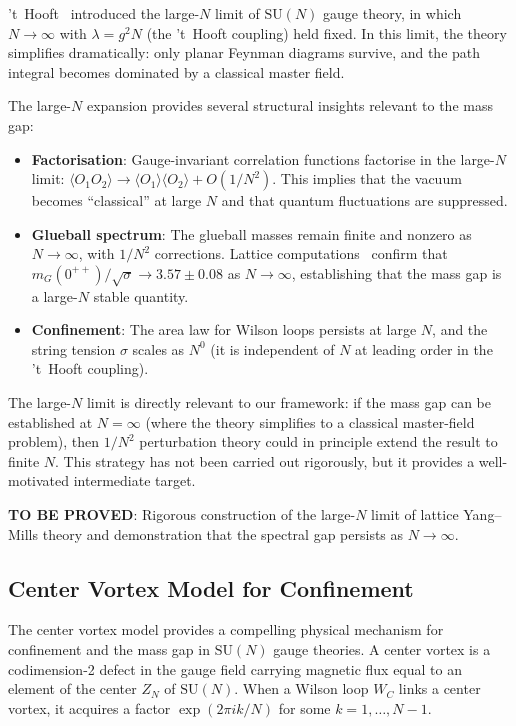 \documentclass[11pt]{article}
\begin{document}
't~Hooft~\cite{tHooft} introduced the large-$N$ limit of $\mathrm{SU}(N)$
gauge theory, in which $N \to \infty$ with $\lambda = g^2 N$ (the
't~Hooft coupling) held fixed.  In this limit, the theory simplifies
dramatically: only planar Feynman diagrams survive, and the path integral
becomes dominated by a classical master field.

The large-$N$ expansion provides several structural insights relevant to
the mass gap:
\begin{itemize}
  \item \textbf{Factorisation}: Gauge-invariant correlation functions
    factorise in the large-$N$ limit:
    $\langle O_1 O_2 \rangle \to \langle O_1 \rangle \langle O_2 \rangle
    + O(1/N^2)$.  This implies that the vacuum becomes ``classical'' at
    large $N$ and that quantum fluctuations are suppressed.
  \item \textbf{Glueball spectrum}: The glueball masses remain finite and
    nonzero as $N \to \infty$, with $1/N^2$ corrections.  Lattice
    computations~\cite{LTW} confirm that
    $m_G(0^{++})/\sqrt{\sigma} \to 3.57 \pm 0.08$ as $N \to \infty$,
    establishing that the mass gap is a large-$N$ stable quantity.
  \item \textbf{Confinement}: The area law for Wilson loops persists at
    large $N$, and the string tension $\sigma$ scales as $N^0$ (it is
    independent of $N$ at leading order in the 't~Hooft coupling).
\end{itemize}

\noindent
The large-$N$ limit is directly relevant to our framework: if the mass gap
can be established at $N = \infty$ (where the theory simplifies to a
classical master-field problem), then $1/N^2$ perturbation theory could in
principle extend the result to finite $N$.  This strategy has not been
carried out rigorously, but it provides a well-motivated intermediate target.

\textbf{TO BE PROVED}: Rigorous construction of the large-$N$ limit of
lattice Yang--Mills theory and demonstration that the spectral gap persists
as $N \to \infty$.

\subsection{Center Vortex Model for Confinement}
\label{sec:center-vortex}

The center vortex model provides a compelling physical mechanism for
confinement and the mass gap in $\mathrm{SU}(N)$ gauge theories.  A
center vortex is a codimension-2 defect in the gauge field carrying
magnetic flux equal to an element of the center $Z_N$ of
$\mathrm{SU}(N)$.  When a Wilson loop $W_C$ links a center vortex, it
acquires a factor $\exp(2\pi i k/N)$ for some $k = 1, \ldots, N-1$.
\end{document}
